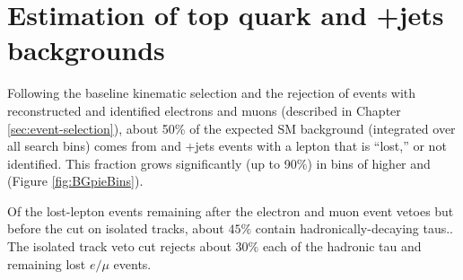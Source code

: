 \section{Estimation of top quark and {\PW}+jets backgrounds}
\label{sec:lost-leptons-overview}

Following the baseline kinematic selection and the rejection of events
with reconstructed and identified electrons and muons (described in
Chapter \ref{sec:event-selection}), about 50\% of the expected SM
background (integrated over all search bins) comes from \ttbar and
{\PW}+jets events with a lepton that is ``lost,'' or not identified.
This fraction grows significantly (up to 90\%) in bins of higher \njets
and \nbjets (Figure \ref{fig:BGpieBins}).

Of the lost-lepton events remaining after the electron and muon event vetoes
but before the cut on isolated tracks, about $45\%$ contain hadronically-decaying taus.. The isolated track veto cut rejects about $30\%$ each of the hadronic tau and remaining lost $e/\mu$ events.



